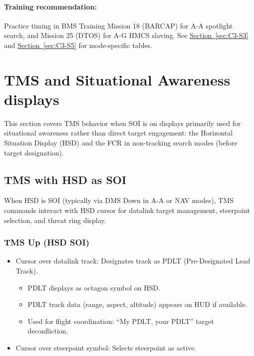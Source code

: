 \documentclass[11pt, a4paper, twoside]{report}
\newcommand{\secref}[1]{\hyperref[#1]{Section~\ref*{#1}}}
\begin{document}
\paragraph{Training recommendation:}
Practice timing in BMS Training Mission 18 (BARCAP) for A-A spotlight search, and Mission 25 (DTOS) for A-G HMCS slaving. See \secref{sec:C3-S3} and \secref{sec:C3-S5} for mode-specific tables.

\newpage
\section{TMS and Situational Awareness displays}
\label{sec:C4-S2}

This section covers TMS behavior when SOI is on displays primarily used for situational awareness rather than direct target engagement: the Horizontal Situation Display (HSD) and the FCR in non-tracking search modes (before target designation).

\subsection{TMS with HSD as SOI}
\label{sec:C4-S2-S1}

When HSD is SOI (typically via DMS Down in A-A or NAV modes), TMS commands 
interact with HSD cursor for datalink target management, steerpoint selection, 
and threat ring display.

\subsubsection*{TMS Up (HSD SOI)}
\label{sec:C4-S2-S1-S1}

\begin{itemize}[nosep]
	\item Cursor over datalink track: Designates track as PDLT (Pre-Designated Lead Track).
	\begin{itemize}[nosep]
		\item PDLT displays as octagon symbol on HSD.
		\item PDLT track data (range, aspect, altitude) appears on HUD if available.
		\item Used for flight coordination: ``My PDLT, your PDLT'' target deconfliction.
	\end{itemize}
	\item Cursor over steerpoint symbol: Selects steerpoint as active.
\end{itemize}
\end{document}
